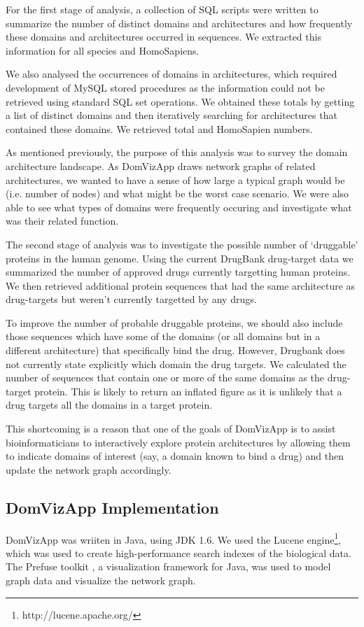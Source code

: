 For the first stage of analysis, a collection of SQL scripts were written to summarize the number of distinct domains and architectures and how frequently these domains and architectures occurred in sequences. We extracted this information for all species and HomoSapiens.

We also analysed the occurrences of domains in architectures, which required development of MySQL stored procedures as the information could not be retrieved using standard SQL set operations. We obtained these totals by getting a list of distinct domains and then iteratively searching for architectures that contained these domains. We retrieved total and HomoSapien numbers.

As mentioned previously, the purpose of this analysis was to survey the domain architecture landscape. As DomVizApp draws network graphs of related architectures, we wanted to have a sense of how large a typical graph would be (i.e. number of nodes) and what might be the worst case scenario. We were also able to see what types of domains were frequently occuring and investigate what was their related function.

The second stage of analysis was to investigate the possible number of `druggable' proteins in the human genome. Using the current DrugBank drug-target data we summarized the number of approved drugs currently targetting human proteins. We then retrieved additional protein sequences that had the same architecture as drug-targets but weren't currently targetted by any drugs.

To improve the number of probable druggable proteins, we should also include those sequences which have some of the domains (or all domains but in a different architecture) that specifically bind the drug. However, Drugbank does not currently state explicitly which domain the drug targets. We calculated the number of sequences that contain one or more of the same domains as the drug-target protein. This is likely to return an inflated figure as it is unlikely that a drug targets all the domains in a target protein.

This shortcoming is a reason that one of the goals of DomVizApp is to assist bioinformaticians to interactively explore protein architectures by allowing them to indicate domains of interest (say, a domain known to bind a drug) and then update the network graph accordingly.


\subsection{DomVizApp Implementation}
DomVizApp was wriiten in Java, using JDK 1.6. We used the Lucene engine\footnote{http://lucene.apache.org/}, which was used to create high-performance search indexes of the biological data. The Prefuse toolkit \cite{prefuse}, a visualization framework for Java, was used to model graph data and visualize the network graph.

